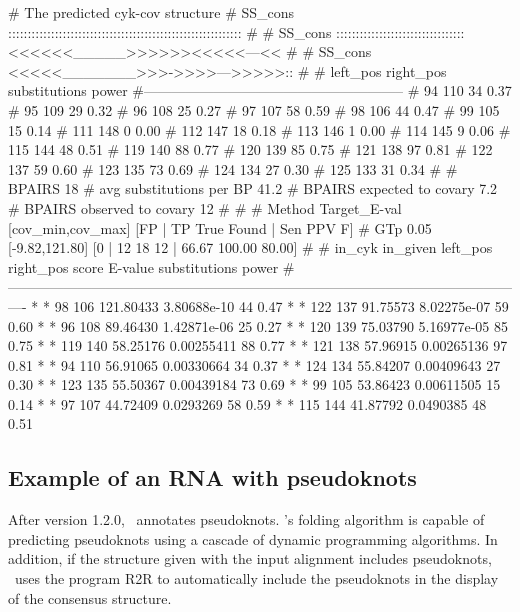 \begin{sreoutput}
# The predicted cyk-cov structure
# SS_cons ::::::::::::::::::::::::::::::::::::::::::::::::::::::::::::
#
# SS_cons :::::::::::::::::::::::::::::::::<<<<<<_____>>>>>><<<<<---<<
#
# SS_cons <<<<<_______>>>->>>>--->>>>>::
#
# left_pos      right_pos    substitutions      power
#--------------------------------------------------------
# 94		110		34		0.37
# 95		109		29		0.32
# 96		108		25		0.27
# 97		107		58		0.59
# 98		106		44		0.47
# 99		105		15		0.14
# 111		148		0		0.00
# 112		147		18		0.18
# 113		146		1		0.00
# 114		145		9		0.06
# 115		144		48		0.51
# 119		140		88		0.77
# 120		139		85		0.75
# 121		138		97		0.81
# 122		137		59		0.60
# 123		135		73		0.69
# 124		134		27		0.30
# 125		133		31		0.34
#
# BPAIRS 18
# avg substitutions per BP  41.2
# BPAIRS expected to covary 7.2
# BPAIRS observed to covary 12
#
#
# Method Target_E-val [cov_min,cov_max] [FP | TP True Found | Sen PPV F] 
# GTp    0.05         [-9.82,121.80]     [0 | 12 18 12 | 66.67 100.00 80.00] 
#
# in_cyk in_given   left_pos       right_pos      score           E-value    substitutions      power
#----------------------------------------------------------------------------------------------------------------
*	*	        98	       106	121.80433	3.80688e-10	44		0.47
*	*	       122	       137	91.75573	8.02275e-07	59		0.60
*	*	        96	       108	89.46430	1.42871e-06	25		0.27
*	*	       120	       139	75.03790	5.16977e-05	85		0.75
*	*	       119	       140	58.25176	0.00255411	88		0.77
*	*	       121	       138	57.96915	0.00265136	97		0.81
*	*	        94	       110	56.91065	0.00330664	34		0.37
*	*	       124	       134	55.84207	0.00409643	27		0.30
*	*	       123	       135	55.50367	0.00439184	73		0.69
*	*	        99	       105	53.86423	0.00611505	15		0.14
*	*	        97	       107	44.72409	0.0293269	58		0.59
*	*	       115	       144	41.87792	0.0490385	48		0.51
\end{sreoutput}


\subsection{Example of an RNA with pseudoknots}

After version 1.2.0, \rscape\ annotates pseudoknots. \rscape's folding
algorithm is capable of predicting pseudoknots using a cascade of
dynamic programming algorithms.  In addition, if the structure given
with the input alignment includes pseudoknots, \rscape\ uses the
program R2R to automatically include the pseudoknots in the display of
the consensus structure.

